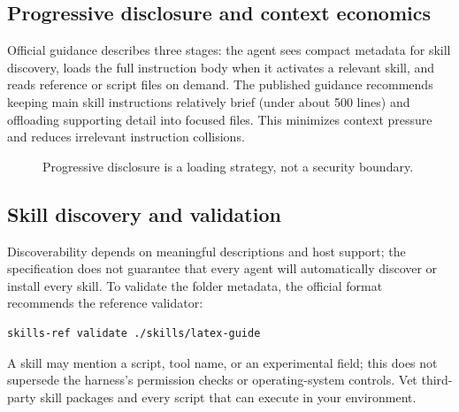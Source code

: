 \documentclass[11pt,letterpaper]{article}
\begin{document}
\subsection{Progressive disclosure and context economics}
Official guidance describes three stages: the agent sees compact metadata for skill discovery, loads the full instruction body when it activates a relevant skill, and reads reference or script files on demand. The published guidance recommends keeping main skill instructions relatively brief (under about 500 lines) and offloading supporting detail into focused files. This minimizes context pressure and reduces irrelevant instruction collisions.\cite{agentskills}

\begin{figure}[htbp]\centering
{}
\caption{Progressive disclosure is a loading strategy, not a security boundary.}
\end{figure}

\subsection{Skill discovery and validation}
Discoverability depends on meaningful descriptions and host support; the specification does not guarantee that every agent will automatically discover or install every skill. To validate the folder metadata, the official format recommends the  reference validator:\cite{agentskills}
\par\smallskip{}\par
\begin{verbatim}
skills-ref validate ./skills/latex-guide
\end{verbatim}

\begin{cautionbox}
A skill may mention a script, tool name, or an experimental  field; this does not supersede the harness's permission checks or operating-system controls. Vet third-party skill packages and every script that can execute in your environment.
\end{cautionbox}
\end{document}
